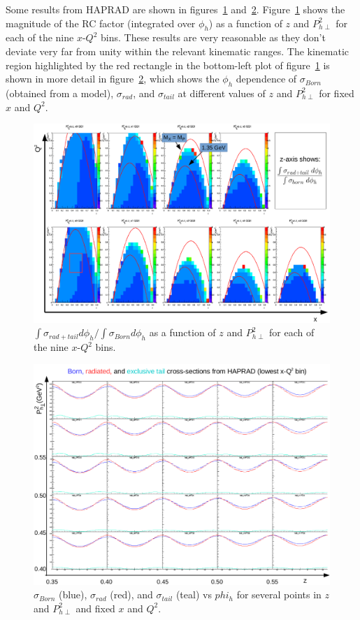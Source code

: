 Some results from HAPRAD are shown in figures~\ref{fig:RCmagnitude_4D_intPhih} and~\ref{fig:RC_zPT2grid_x0QQ0}.
Figure~\ref{fig:RCmagnitude_4D_intPhih} shows the magnitude of the RC factor (integrated over $\phi_h$) as a function of $z$ and $P_{h\perp}^2$ for each of the nine $x$-$Q^2$ bins.
These results are very reasonable as they don't deviate very far from unity within the relevant kinematic ranges.
The kinematic region highlighted by the red rectangle in the bottom-left plot of figure~\ref{fig:RCmagnitude_4D_intPhih} is shown in more detail in figure~\ref{fig:RC_zPT2grid_x0QQ0}, which shows the $\phi_h$ dependence of $\sigma_{Born}$ (obtained from a model), $\sigma_{rad}$, and $\sigma_{tail}$ at different values of $z$ and $P_{h\perp}^2$ for fixed $x$ and $Q^2$.
%
\begin{figure}
\centering
\includegraphics[width=8.5in]{figures/RCmagnitude_4D_intPhih.png}
\caption{$\int \sigma_{rad+tail} d\phi_h / \int \sigma_{Born} d\phi_h$ as a function of $z$ and $P_{h\perp}^2$ for each of the nine $x$-$Q^2$ bins.}
\label{fig:RCmagnitude_4D_intPhih}
\end{figure}
%
\begin{figure}
\centering
\includegraphics[width=8.5in]{figures/RC_zPT2grid_x0QQ0.png}
\caption{$\sigma_{Born}$ (blue), $\sigma_{rad}$ (red), and $\sigma_{tail}$ (teal) vs $phi_h$ for several points in $z$ and $P_{h\perp}^2$ and fixed $x$ and $Q^2$.}
\label{fig:RC_zPT2grid_x0QQ0}
\end{figure}
